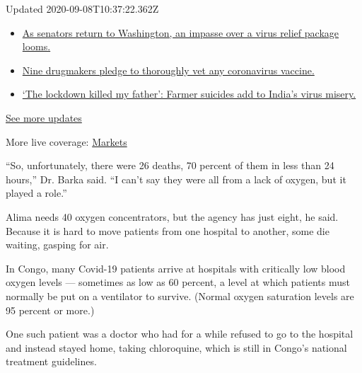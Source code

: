 Updated 2020-09-08T10:37:22.362Z

\begin{itemize}
\tightlist
\item
  \href{https://www.nytimes3xbfgragh.onion/2020/09/08/world/covid-19-coronavirus.html?action=click\&pgtype=Article\&state=default\&region=MAIN_CONTENT_1\&context=storylines_live_updates\#link-4a77847f}{As
  senators return to Washington, an impasse over a virus relief package
  looms.}
\item
  \href{https://www.nytimes3xbfgragh.onion/2020/09/08/world/covid-19-coronavirus.html?action=click\&pgtype=Article\&state=default\&region=MAIN_CONTENT_1\&context=storylines_live_updates\#link-679303d7}{Nine
  drugmakers pledge to thoroughly vet any coronavirus vaccine.}
\item
  \href{https://www.nytimes3xbfgragh.onion/2020/09/08/world/covid-19-coronavirus.html?action=click\&pgtype=Article\&state=default\&region=MAIN_CONTENT_1\&context=storylines_live_updates\#link-1c973131}{`The
  lockdown killed my father': Farmer suicides add to India's virus
  misery.}
\end{itemize}

\href{https://www.nytimes3xbfgragh.onion/2020/09/08/world/covid-19-coronavirus.html?action=click\&pgtype=Article\&state=default\&region=MAIN_CONTENT_1\&context=storylines_live_updates}{See
more updates}

More live coverage:
\href{https://www.nytimes3xbfgragh.onion/live/2020/09/08/business/stock-market-today-coronavirus?action=click\&pgtype=Article\&state=default\&region=MAIN_CONTENT_1\&context=storylines_live_updates}{Markets}

``So, unfortunately, there were 26 deaths, 70 percent of them in less
than 24 hours,'' Dr. Barka said. ``I can't say they were all from a lack
of oxygen, but it played a role.''

Alima needs 40 oxygen concentrators, but the agency has just eight, he
said. Because it is hard to move patients from one hospital to another,
some die waiting, gasping for air.

In Congo, many Covid-19 patients arrive at hospitals with critically low
blood oxygen levels --- sometimes as low as 60 percent, a level at which
patients must normally be put on a ventilator to survive. (Normal oxygen
saturation levels are 95 percent or more.)

One such patient was a doctor who had for a while refused to go to the
hospital and instead stayed home, taking chloroquine, which is still in
Congo's national treatment guidelines.

